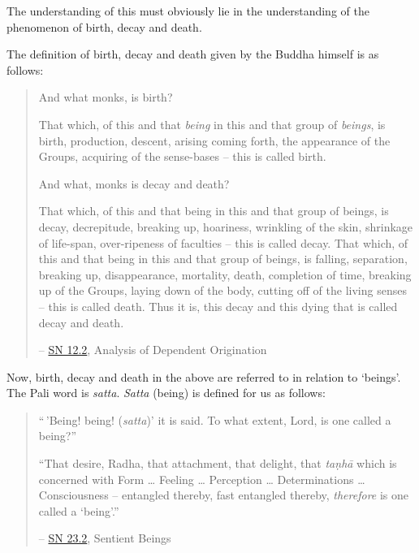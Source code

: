 The understanding of this must obviously lie in the understanding of the phenomenon of birth, decay and death.

The definition of birth, decay and death given by the Buddha himself is as follows:

\begin{quote}
And what monks, is birth?

That which, of this and that \emph{being} in this and that group of \emph{beings}, is birth, production, descent, arising coming forth, the appearance of the Groups, acquiring of the sense-bases -- this is called birth.

And what, monks is decay and death?

That which, of this and that being in this and that group of beings, is decay, decrepitude, breaking up, hoariness, wrinkling of the skin, shrinkage of life-span, over-ripeness of faculties -- this is called decay. That which, of this and that being in this and that group of beings, is falling, separation, breaking up, disappearance, mortality, death, completion of time, breaking up of the Groups, laying down of the body, cutting off of the living senses -- this is called death. Thus it is, this decay and this dying that is called decay and death.

 -- \href{https://suttacentral.net/sn12.2/en/bodhi}{SN 12.2}, Analysis of Dependent Origination
\end{quote}

Now, birth, decay and death in the above are referred to in relation to `beings'. The Pali word is \textit{satta}. \textit{Satta} (being) is defined for us as follows:

\begin{quote}
``\,'Being! being! (\textit{satta})' it is said. To what extent, Lord, is one called a being?''

``That desire, Radha, that attachment, that delight, that \textit{taṇhā} which is concerned with Form \ldots\hspace{0pt} Feeling \ldots\hspace{0pt} Perception \ldots\hspace{0pt} Determinations \ldots\hspace{0pt} Consciousness -- entangled thereby, fast entangled thereby, \emph{therefore} is one called a `being'.''

 -- \href{https://suttacentral.net/sn23.2/en/sujato}{SN 23.2}, Sentient Beings
\end{quote}

